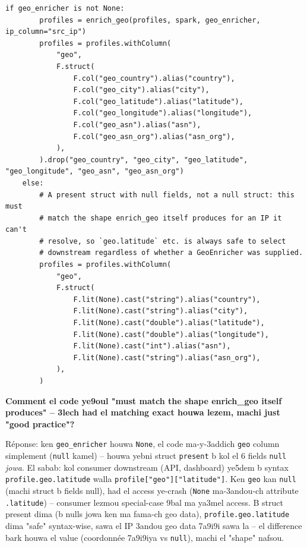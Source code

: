 \documentclass[11pt,a4paper]{report}
\DeclareRobustCommand{\code}[1]{\texttt{#1}}
\begin{document}
\begin{lstlisting}[style=pystyle]
    if geo_enricher is not None:
        profiles = enrich_geo(profiles, spark, geo_enricher, ip_column="src_ip")
        profiles = profiles.withColumn(
            "geo",
            F.struct(
                F.col("geo_country").alias("country"),
                F.col("geo_city").alias("city"),
                F.col("geo_latitude").alias("latitude"),
                F.col("geo_longitude").alias("longitude"),
                F.col("geo_asn").alias("asn"),
                F.col("geo_asn_org").alias("asn_org"),
            ),
        ).drop("geo_country", "geo_city", "geo_latitude", "geo_longitude", "geo_asn", "geo_asn_org")
    else:
        # A present struct with null fields, not a null struct: this must
        # match the shape enrich_geo itself produces for an IP it can't
        # resolve, so `geo.latitude` etc. is always safe to select
        # downstream regardless of whether a GeoEnricher was supplied.
        profiles = profiles.withColumn(
            "geo",
            F.struct(
                F.lit(None).cast("string").alias("country"),
                F.lit(None).cast("string").alias("city"),
                F.lit(None).cast("double").alias("latitude"),
                F.lit(None).cast("double").alias("longitude"),
                F.lit(None).cast("int").alias("asn"),
                F.lit(None).cast("string").alias("asn_org"),
            ),
        )
\end{lstlisting}

\begin{soual}
\textbf{Comment el code ye9oul "must match the shape enrich\_geo itself
produces" -- 3lech had el matching exact houwa lezem, machi just
"good practice"?}

Réponse: ken \code{geo\_enricher} houwa \code{None}, el code ma-y-3addich
\code{geo} column simplement (\code{null} kamel) -- houwa yebni struct
\code{present} b kol el 6 fields \code{null} \emph{jowa}. El sabab: kol
consumer downstream (API, dashboard) ye5dem b syntax \code{profile.geo.latitude}
walla \code{profile["geo"]["latitude"]}. Ken \code{geo} kan \code{null}
(machi struct b fields null), had el access ye-crash (\code{None} ma-3andou-ch
attribute \code{.latitude}) -- consumer lezmou special-case 9bal ma
ya3mel access. B struct present dima (b nulls jowa ken ma fama-ch geo
data), \code{profile.geo.latitude} dima "safe" syntax-wise, sawa el IP
3andou geo data 7a9i9i sawa la -- el difference bark houwa el value
(coordonnée 7a9i9iya vs \code{null}), machi el "shape" nafsou.
\end{soual}
\end{document}
